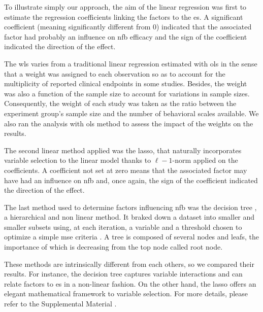 To illustrate simply our approach, the aim of the linear regression was first to estimate the regression coefficients
linking the factors to the \gls{es}. A significant coefficient (meaning significantly different from 0) indicated 
that the associated factor had probably an influence on \gls{nfb} efficacy and the sign of the coefficient indicated 
the direction of the effect.

The \gls{wls} varies from a traditional linear regression estimated with \gls{ols} in the sense that a weight was assigned 
to each observation so as to account for the multiplicity of reported clinical endpoints in some studies. Besides, the 
weight was also a function of the sample size to account for variations in sample sizes. Consequently, the weight of each study 
was taken as the ratio between the experiment group's sample size and the number of behavioral scales available.
We also ran the analysis with \gls{ols} method to assess the impact of the weights on the results. 

The second linear method applied was the \gls{lasso}, that naturally incorporates variable selection 
to the linear model thanks to $\ell-1$-norm applied on the coefficients. A coefficient not set at zero means that 
the associated factor may have had an influence on \gls{nfb} and, once again, the sign of the coefficient indicated the 
direction of the effect.

The last method used to determine factors influencing \gls{nfb} was the decision tree \citep{Quinlan1986}, a hierarchical 
and non linear method. It braked down a dataset into smaller and smaller subsets using, at each iteration, a variable and 
a threshold chosen to optimize a simple \gls{mse} criteria \citep{James2013}. A tree is composed of several nodes and leafs, 
the importance of which is decreasing from the top node called root node. 

These methods are intrinsically different from each others, so we compared their results. For instance, the decision
tree captures variable interactions and can relate factors to \gls{es} in a non-linear fashion. On the other hand, the
\gls{lasso} offers an elegant mathematical framework to variable selection. For more details, please refer to the Supplemental Material
\citep{Supplementalmaterial}.















